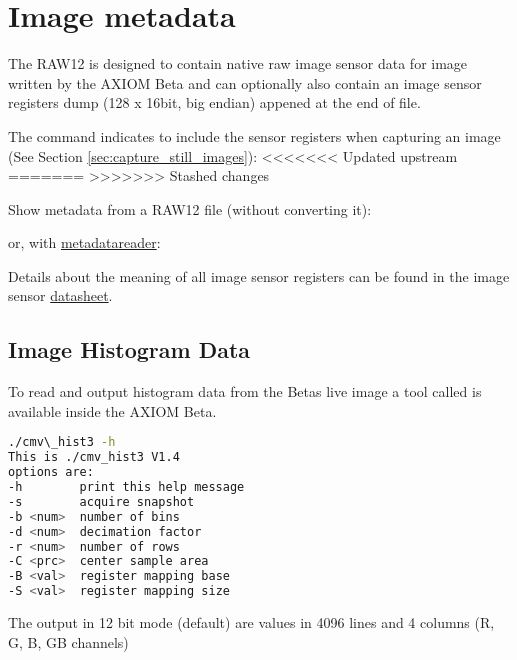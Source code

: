 \section{Image metadata}
The RAW12 is designed to contain native raw image sensor data for image written by the AXIOM Beta and can optionally also contain an image sensor registers dump (128 x 16bit, big endian) appened at the end of file.  

The  command indicates to include the sensor registers when capturing an image (See Section \ref{sec:capture_still_images}):
<<<<<<< Updated upstream
=======
>>>>>>> Stashed changes

Show metadata from a RAW12 file (without converting it):


or, with \href{https://github.com/apertus-open-source-cinema/misc-tools-utilities/tree/master/cmv12000-metadata-reader}{metadatareader}:


Details about the meaning of all image sensor registers can be found in the image sensor  \href{https://github.com/apertus-open-source-cinema/beta-hardware/tree/master/Datasheets}{datasheet}. 

\subsection{Image Histogram Data}

To read and output histogram data from the Betas live image a tool called  is available inside the AXIOM Beta.

\begin{lstlisting}[language=bash,morekeywords=$,keywordstyle=\bfseries,frame=none,xleftmargin=.25in,belowskip=2em]
./cmv\_hist3 -h                                                   
This is ./cmv_hist3 V1.4                                                        
options are:                                                                    
-h        print this help message                                               
-s        acquire snapshot                                                      
-b <num>  number of bins                                                        
-d <num>  decimation factor                                                     
-r <num>  number of rows                                                        
-C <prc>  center sample area                                                    
-B <val>  register mapping base                                                 
-S <val>  register mapping size
\end{lstlisting}

The output in 12 bit mode (default) are values in 4096 lines and 4 columns (R, G, B, GB channels) 